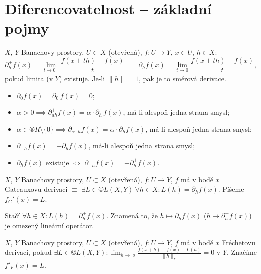 \documentclass[12pt]{article}					%
\begin{document}

\section{Diferencovatelnost – základní pojmy}

\begin{definice}
	$X$, $Y$ Banachovy prostory, $U \subset X$ (otevřená), $f: U \rightarrow Y$, $x \in U$, $h \in X$:
	$$ \partial_h^+ f(x) = \lim_{t \rightarrow 0_+} \frac{f(x + th) - f(x)}{t} \qquad \partial_h f(x) = \lim_{t \rightarrow 0} \frac{f(x + th) - f(x)}{t}, $$
	pokud limita (v $Y$) existuje. Je-li $\|h\| = 1$, pak je to směrová derivace.
\end{definice}

\begin{poznamka}
	\begin{itemize}
		\item $\partial_0 f(x) = \partial_0^+ f(x) = 0$;
		\item $α > 0 \implies \partial_{ah}^+ f(x) = α·\partial_h^+ f(x)$, má-li alespoň jedna strana smysl;
		\item $α \in ®R \setminus \{0\} \implies \partial_{α·h} f(x) = α·\partial_h f(x)$, má-li alespoň jedna strana smysl;
		\item $\partial_{-h} f(x) = -\partial_h f(x)$, má-li alespoň jedna strana smysl;
		\item $\partial_h f(x)$ existuje $\Leftrightarrow$ $\partial_{-h}^+ f(x) = -\partial_h^+ f(x)$.
	\end{itemize}
\end{poznamka}

\begin{definice}
	$X$, $Y$ Banachovy prostory, $U \subset X$ (otevřená), $f: U \rightarrow Y$, $f$ má v bodě $x$ Gateauxovu derivaci $≡$ $\exists L \in ©L(X, Y)\ \forall h \in X: L(h) = \partial_h f(x)$. Píšeme $f_G'(x) = L$.

	\begin{poznamkain}
		Stačí $\forall h \in X: L(h) = \partial_h^+ f(x)$. Znamená to, že $h \mapsto \partial_h f(x)$ ($h \mapsto \partial_h^+ f(x)$) je omezený lineární operátor.
	\end{poznamkain}
\end{definice}

\begin{definice}
	$X$, $Y$ Banachovy prostory, $U \subset X$ (otevřená), $f: U \rightarrow Y$, $f$ má v bodě $x$ Fréchetovu derivaci, pokud $\exists L \in ©L(X, Y): \lim_{h \rightarrow ¦o} \frac{f(x + h) - f(x) - L(h)}{\|h\|_X} = 0$ v $Y$. Značíme $f'_F(x) = L$.
\end{definice}
\end{document}
